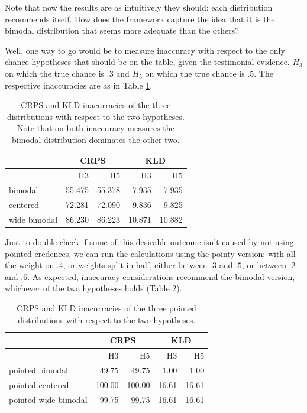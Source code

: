 \documentclass[
  10pt,
  dvipsnames,enabledeprecatedfontcommands]{scrartcl}
\begin{document}
Note that now the results are as intuitively they should: each
distribution recommends itself. How does the framework capture the idea
that it is the bimodal distribution that seems more adequate than the
others?

Well, one way to go would be to measure inaccuracy with respect to the
only chance hypotheses that should be on the table, given the
testimonial evidence. \(H_3\) on which the true chance is \(.3\) and
\(H_5\) on which the true chance is \(.5\). The respective inaccuracies
are as in Table \ref{tab:schoen}.

\begin{table}[H]
\begin{tabular}{lrrrr}
 & \multicolumn{2}{c}{CRPS} & \multicolumn{2}{c}{KLD} \\
\toprule
&H3 & H5 & H3 & H5\\
\midrule
bimodal &55.475 & 55.378 & 7.935 & 7.935\\
centered &72.281 & 72.090 & 9.836 & 9.825\\
wide bimodal & 86.230 & 86.223 & 10.871 & 10.882\\
\bottomrule
\end{tabular}
\caption{CRPS and KLD inacurracies of the three distributions with respect to the two hypotheses. Note that on both inaccuracy measures the bimodal distribution dominates the other two.}
\label{tab:schoen}
\end{table}

Just to double-check if some of this desirable outcome isn't caused by
not using pointed credences, we can run the calculations using the
pointy version: with all the weight on .4, or weights split in half,
either between \(.3\) and \(.5\), or between \(.2\) and \(.6\). As
expected, inaccuracy considerations recommend the bimodal version,
whichever of the two hypotheses holds (Table \ref{tab:schoen2}).

\begin{table}[H]
\begin{tabular}{lrrrr}
 & \multicolumn{2}{c}{CRPS} & \multicolumn{2}{c}{KLD} \\
\toprule
 &H3 & H5 & H3 & H5\\ \midrule
pointed bimodal &49.75 & 49.75 & 1.00 & 1.00\\
pointed centered &100.00 & 100.00 & 16.61 & 16.61\\
pointed wide bimodal & 99.75 & 99.75 & 16.61 & 16.61\\
\bottomrule
\end{tabular}
\caption{CRPS and KLD inacurracies of the three pointed distributions with respect to the two hypotheses.}
\label{tab:schoen2}
\end{table}
\end{document}
